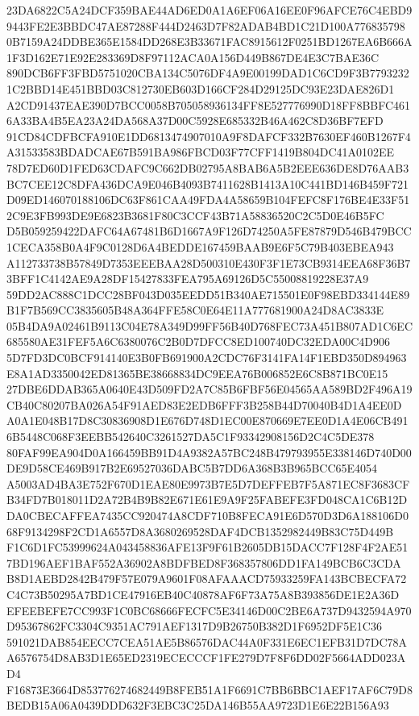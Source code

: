 \documentclass[UTF8,fontset=fandol,zihao=-4,a4paper]{ctexart}
\begin{document}
{{23DA6822C5A24DCF359BAE44AD6ED0A1A6EF06A16EE0F96AFCE76C4EBD99443FE2E3BBDC47AE87288F444D2463D7F82ADAB4BD1C21D100A776835798
0B7159A24DDBE365E1584DD268E3B33671FAC8915612F0251BD1267EA6B666A1F3D162E71E92E283369D8F97112ACA0A156D449B867DE4E3C7BAE36C
890DCB6FF3FBD5751020CBA134C5076DF4A9E00199DAD1C6CD9F3B77932321C2BBD14E451BBD03C812730EB603D166CF284D29125DC93E23DAE826D1
A2CD91437EAE390D7BCC0058B705058936134FF8E527776990D18FF8BBFC4616A33BA4B5EA23A24DA568A37D00C5928E685332B46A462C8D36BF7EFD
91CD84CDFBCFA910E1DD6813474907010A9F8DAFCF332B7630EF460B1267F4A31533583BDADCAE67B591BA986FBCD03F77CFF1419B804DC41A0102EE
78D7ED60D1FED63CDAFC9C662DB02795A8BAB6A5B2EEE636DE8D76AAB3BC7CEE12C8DFA436DCA9E046B4093B7411628B1413A10C441BD146B459F721
D09ED146070188106DC63F861CAA49FDA4A58659B104FEFC8F176BE4E33F512C9E3FB993DE9E6823B3681F80C3CCF43B71A58836520C2C5D0E46B5FC
D5B059259422DAFC64A67481B6D1667A9F126D74250A5FE87879D546B479BCC1CECA358B0A4F9C0128D6A4BEDDE167459BAAB9E6F5C79B403EBEA943
A112733738B57849D7353EEEBAA28D500310E430F3F1E73CB9314EEA68F36B73BFF1C4142AE9A28DF15427833FEA795A69126D5C55008819228E37A9
59DD2AC888C1DCC28BF043D035EEDD51B340AE715501E0F98EBD334144E89B1F7B569CC3835605B48A364FFE58C0E64E11A777681900A24D8AC3833E
05B4DA9A02461B9113C04E78A349D99FF56B40D768FEC73A451B807AD1C6EC685580AE31FEF5A6C6380076C2B0D7DFCC8ED100740DC32EDA00C4D906
5D7FD3DC0BCF914140E3B0FB691900A2CDC76F3141FA14F1EBD350D894963E8A1AD3350042ED81365BE38668834DC9EEA76B006852E6C8B871BC0E15
27DBE6DDAB365A0640E43D509FD2A7C85B6FBF56E04565AA589BD2F496A19CB40C80207BA026A54F91AED83E2EDB6FFF3B258B44D70040B4D1A4EE0D
A0A1E048B17D8C30836908D1E676D748D1EC00E870669E7EE0D1A4E06CB4916B5448C068F3EEBB542640C3261527DA5C1F93342908156D2C4C5DE378
80FAF99EA904D0A166459BB91D4A9382A57BC248B479793955E338146D740D00DE9D58CE469B917B2E69527036DABC5B7DD6A368B3B965BCC65E4054
A5003AD4BA3E752F670D1EAE80E9973B7E5D7DEFFEB7F5A871EC8F3683CFB34FD7B018011D2A72B4B9B82E671E61E9A9F25FABEFE3FD048CA1C6B12D
DA0CBECAFFEA7435CC920474A8CDF710B8FECA91E6D570D3D6A188106D068F9134298F2CD1A6557D8A3680269528DAF4DCB1352982449B83C75D449B
F1C6D1FC53999624A043458836AFE13F9F61B2605DB15DACC7F128F4F2AE517BD196AEF1BAF552A36902A8BDFBED8F368357806DD1FA149BCB6C3CDA
B8D1AEBD2842B479F57E079A9601F08AFAAACD75933259FA143BCBECFA72C4C73B50295A7BD1CE47916EB40C40878AF6F73A75A8B393856DE1E2A36D
EFEEBEFE7CC993F1C0BC68666FECFC5E34146D00C2BE6A737D9432594A970D95367862FC3304C9351AC791AEF1317D9B26750B382D1F6952DF5E1C36
591021DAB854EECC7CEA51AE5B86576DAC44A0F331E6EC1EFB31D7DC78AA6576754D8AB3D1E65ED2319ECECCCF1FE279D7F8F6DD02F5664ADD023AD4
F16873E3664D853776274682449B8FEB51A1F6691C7BB6BBC1AEF17AF6C79D8BEDB15A06A0439DDD632F3EBC3C25DA146B55AA9723D1E6E22B156A93
}}
\end{document}
